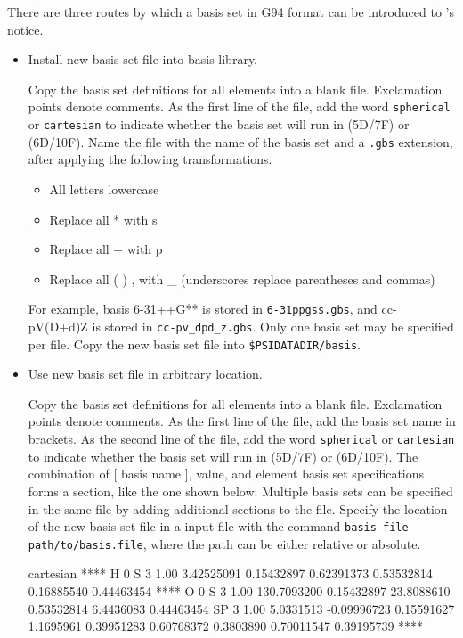 There are three routes by which a basis set in G94 format can be introduced to \PSIfour's notice.

\begin{itemize}

\item Install new basis set file into \PSIfour basis library.

Copy the basis set definitions for all elements into a blank file. Exclamation points denote comments.
As the first line of the file, add the word \texttt{spherical} or \texttt{cartesian} to indicate
whether the basis set will run in (5D/7F) or (6D/10F).
Name the file with the name of the basis set and a \texttt{.gbs} extension, after applying the following transformations.
\begin{itemize}
\item[] All letters lowercase
\item[] Replace all * with s
\item[] Replace all + with p
\item[] Replace all ( ) , with \_ \quad (underscores replace parentheses and commas)
\end{itemize}
For example, basis 6-31++G** is stored in \texttt{6-31ppgss.gbs}, and cc-pV(D+d)Z is stored in \texttt{cc-pv\_dpd\_z.gbs}.
Only one basis set may be specified per file.
Copy the new basis set file into \texttt{\$PSIDATADIR/basis}.

\item Use new basis set file in arbitrary location.

Copy the basis set definitions for all elements into a blank file. Exclamation points denote comments.
As the first line of the file, add the basis set name in brackets.
As the second line of the file, add the word \texttt{spherical} or \texttt{cartesian} to indicate
whether the basis set will run in (5D/7F) or (6D/10F). 
The combination of [ basis name ],  value, and element basis set specifications 
forms a section, like the one shown below.
Multiple basis sets can be specified in the same file by adding additional sections to the file.
Specify the location of the new basis set file in a \PSIfour input file with the command 
\texttt{basis file path/to/basis.file}, where the path can be either relative or absolute.
\begin{Snippet}
[ sto-3g ]
cartesian
****
H     0 
S   3   1.00
      3.42525091             0.15432897       
      0.62391373             0.53532814       
      0.16885540             0.44463454       
****
O     0 
S   3   1.00
    130.7093200              0.15432897       
     23.8088610              0.53532814       
      6.4436083              0.44463454       
SP   3   1.00
      5.0331513             -0.09996723             0.15591627       
      1.1695961              0.39951283             0.60768372       
      0.3803890              0.70011547             0.39195739       
****
\end{Snippet}


\end{itemize}
